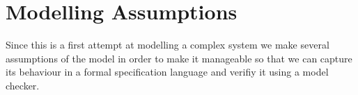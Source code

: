 \begin{comment}



\def\r{3} 
\def\sone{ \sin 32}
\def\stwo{\sin 72}
\def\cone{\cos 32}
\def\ctwo{\cos 72}
\coordinate(top) at (0,\r);
\coordinate(topleft) at ({ \r * -cos (36)},{ \r * -sin (36)});
\coordinate(topright) at ({ \r * cos (72)}, { \r * -sin (72)});
\coordinate(botleft) at ({ \r * - cos (36)},{ \r * sin (36)});
\coordinate(botright) at ({\r * sin (72)},{\r * cos (72)});

\tikzstyle{box1}=[circle, draw, text width = 2cm, font=\scriptsize]
\tikzstyle{box3}=[rectangle, draw, text width = 2cm, font=\scriptsize]
\tikzstyle{arrow}=[->, thick]
\tikzstyle{biarrow}=[<->,very thick,shorten >=7pt,shorten <=7pt]


\node (A) [font = \scriptsize]  at (topleft)                  {D =150 };

\node (B) [font = \scriptsize]    at (botleft)          {D = 0};

\node (C)[font = \scriptsize] at (top)  { D = 100
						};

\node (D)[font = \scriptsize] at (botright)  { D = 50
						};

\node (E) [font = \scriptsize] at (topright) {D = 200};

\draw [arrow] (D) -- node[right] {$t_1$} (E);
\draw [arrow] (A) -- node[below = 10pt] {$t_4$} (B);
\draw [arrow] (B) --  node[above = 10pt] {$t_2$} (C);
\draw [arrow] (C) -- node [left] {$t_3$} (D);
\end{comment}


\section{Modelling Assumptions}
Since this is a first attempt at modelling a complex system we make several assumptions of the model in order to make it manageable so that we can capture its behaviour in a formal specification language and verifiy it using a model checker.

